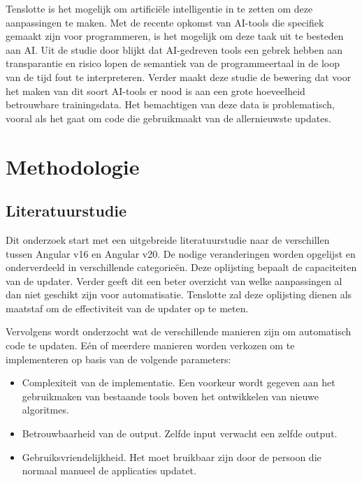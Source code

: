 Tenslotte is het mogelijk om artificiële intelligentie in te zetten om deze aanpassingen te maken.
Met de recente opkomst van AI-tools die specifiek gemaakt zijn voor programmeren, is het mogelijk om deze taak uit te besteden aan AI.
Uit de studie door \textcite{Hodovychenko2025} blijkt dat AI-gedreven tools een gebrek hebben aan transparantie en risico lopen de semantiek van de programmeertaal in de loop van de tijd fout te interpreteren.
Verder maakt deze studie de bewering dat voor het maken van dit soort AI-tools er nood is aan een grote hoeveelheid betrouwbare trainingsdata.
Het bemachtigen van deze data is problematisch, vooral als het gaat om code die gebruikmaakt van de allernieuwste updates.

\section{Methodologie}
\label{sec:methodologie}

\subsection{Literatuurstudie}
\label{sec:methodologie:literatuurstudie}

Dit onderzoek start met een uitgebreide literatuurstudie naar de verschillen tussen Angular v16 en Angular v20.
De nodige veranderingen worden opgelijst en onderverdeeld in verschillende categorieën.
Deze oplijsting bepaalt de capaciteiten van de updater.
Verder geeft dit een beter overzicht van welke aanpassingen al dan niet geschikt zijn voor automatisatie.
Tenslotte zal deze oplijsting dienen als maatstaf om de effectiviteit van de updater op te meten.

Vervolgens wordt onderzocht wat de verschillende manieren zijn om automatisch code te updaten.
Eén of meerdere manieren worden verkozen om te implementeren op basis van de volgende parameters:
\begin{itemize}
  \item Complexiteit van de implementatie. Een voorkeur wordt gegeven aan het gebruikmaken van bestaande tools boven het ontwikkelen van nieuwe algoritmes.
  \item Betrouwbaarheid van de output. Zelfde input verwacht een zelfde output.
  \item Gebruiksvriendelijkheid. Het moet bruikbaar zijn door de persoon die normaal manueel de applicaties updatet.
\end{itemize}

